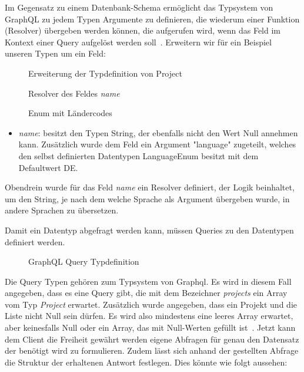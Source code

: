 Im Gegensatz zu einem Datenbank-Schema ermöglicht das Typsystem von GraphQL zu jedem Typen Argumente zu definieren,
die wiederum einer Funktion (Resolver) übergeben werden können,
die aufgerufen wird, wenn das Feld im Kontext einer Query aufgelöst werden soll~\cite{graphql-resolver}.
Erweitern wir für ein Beispiel unseren Typen um ein Feld:

\begin{figure}[h]
    
    \caption{Erweiterung der Typdefinition von Project}
    \label{fig:basics:graphql:3}
\end{figure}

\begin{figure}[h]
    
    \caption{Resolver des Feldes \emph{name}}
    \label{fig:basics:graphql:4}
\end{figure}

\begin{figure}[h]
    
    \caption{Enum mit Ländercodes}
    \label{fig:basics:graphql:2}
\end{figure}

\begin{itemize}
    \item \emph{name}: besitzt den Typen String, der ebenfalls nicht den Wert Null annehmen kann. Zusätzlich wurde dem Feld ein Argument "language" zugeteilt,
    welches den selbst definierten Datentypen LanguageEnum besitzt mit dem Defaultwert DE.
\end{itemize}

Obendrein wurde für das Feld \emph{name} ein Resolver definiert, der Logik beinhaltet, um den String, je nach dem welche Sprache als Argument übergeben wurde,
in andere Sprachen zu übersetzen.

Damit ein Datentyp abgefragt werden kann, müssen Queries zu den Datentypen definiert werden.

\begin{figure}[h]
    
    \caption{GraphQL Query Typdefinition}
    \label{fig:basics:graphql:5}
\end{figure}

Die Query Typen gehören zum Typsystem von Graphql. Es wird in diesem Fall angegeben, dass es eine Query gibt, die mit dem Bezeichner \emph{projects}
ein Array vom Typ \emph{Project} erwartet. Zusätzlich wurde angegeben, dass ein Projekt und die Liste nicht Null sein dürfen.
Es wird also mindestens eine leeres Array erwartet, aber keinesfalls Null oder ein Array, das mit Null-Werten gefüllt ist~\cite{graphql}.
Jetzt kann dem Client die Freiheit gewährt werden eigene Abfragen für genau den Datensatz der benötigt wird zu formulieren.
Zudem lässt sich anhand der gestellten Abfrage die Struktur der erhaltenen Antwort festlegen. Dies könnte wie folgt aussehen:

